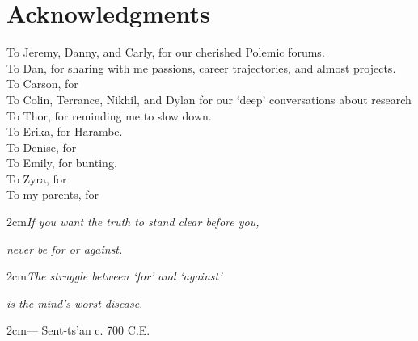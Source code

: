 \section*{Acknowledgments}
To Jeremy, Danny, and Carly, for our cherished Polemic forums.
\\To Dan, for sharing with me passions, career trajectories, and almost projects.
\\To Carson, for 
\\To Colin, Terrance, Nikhil, and Dylan for our `deep' conversations about research
\\To Thor, for reminding me to slow down.
\\To Erika, for Harambe.
\\To Denise, for 
\\To Emily, for bunting.
\\To Zyra, for 
\\To my parents, for
\vfill
\begin{singlespace}
\begin{addmargin}[2cm]  {2cm}\textit{If you want the truth to stand clear before you,}\end{addmargin}
\begin{addmargin}[2.5cm]{2cm}\textit{never be for or against.}\end{addmargin}
\begin{addmargin}[2cm]  {2cm}\textit{The struggle between `for' and `against'}\end{addmargin}
\begin{addmargin}[2.5cm]{2cm}\textit{is the mind's worst disease.}\end{addmargin}
\begin{addmargin}[2cm]  {2cm}\normalfont\flushright --- Sent-ts'an c. 700 C.E.\end{addmargin}
\end{singlespace}
\pagestyle{plain}

